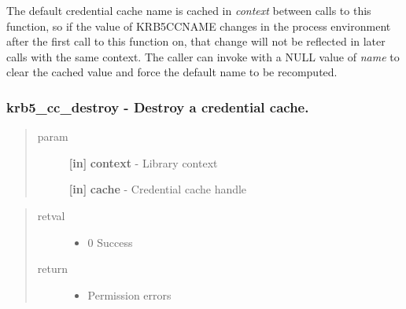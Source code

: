 \documentclass[letterpaper,10pt,english]{sphinxmanual}
\begin{document}
The default credential cache name is cached in \emph{context} between calls to this function, so if the value of KRB5CCNAME changes in the process environment after the first call to this function on, that change will not be reflected in later calls with the same context. The caller can invoke {\hyperref[appdev/refs/api/krb5_cc_set_default_name:krb5_cc_set_default_name]{}} with a NULL value of \emph{name} to clear the cached value and force the default name to be recomputed.


\subsubsection{krb5\_cc\_destroy -  Destroy a credential cache.}
\label{appdev/refs/api/krb5_cc_destroy:krb5-cc-destroy-destroy-a-credential-cache}\label{appdev/refs/api/krb5_cc_destroy::doc}

\begin{fulllineitems}
\label{appdev/refs/api/krb5_cc_destroy:krb5_cc_destroy}
\end{fulllineitems}

\begin{quote}\begin{description}
\item[{param}] \leavevmode
\textbf{{[}in{]}} \textbf{context} - Library context

\textbf{{[}in{]}} \textbf{cache} - Credential cache handle

\end{description}\end{quote}
\begin{quote}\begin{description}
\item[{retval}] \leavevmode\begin{itemize}
\item {} 
0   Success

\end{itemize}

\item[{return}] \leavevmode\begin{itemize}
\item {} 
Permission errors

\end{itemize}

\end{description}\end{quote}
\end{document}
